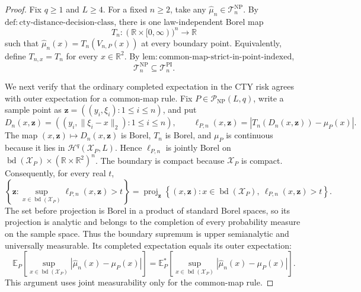 \documentclass{article}
\begin{document}
\begin{proof}
Fix \(q\geq1\) and \(L\geq4\).  For a fixed \(n\geq2\), take any \(\widehat\mu_n\in\mathcal T_n^{\mathrm{NP}}\).  By \(\mathrm{def:cty\text{-}distance\text{-}decision\text{-}class}\), there is one law-independent Borel map
\[
 T_n:(\mathbb R\times[0,\infty))^n\longrightarrow\mathbb R
\]
such that \(\widehat\mu_n(x)=T_n(V_{n,P}(x))\) at every boundary point.  Equivalently, define \(T_{n,x}=T_n\) for every \(x\in\mathbb R^2\).  By \(\mathrm{lem:common\text{-}map\text{-}strict\text{-}in\text{-}point\text{-}indexed}\),
\[
 \mathcal T_n^{\mathrm{NP}}\subseteq\mathcal T_n^{\mathrm{PI}}.
\]

We next verify that the ordinary completed expectation in the CTY risk agrees with outer expectation for a common-map rule.  Fix \(P\in\mathcal P_{\mathrm{NP}}(L,q)\), write a sample point as \(\mathbf z=((y_i,\xi_i):1\leq i\leq n)\), and put
\[
 D_n(x,\mathbf z)=((y_i,\lVert\xi_i-x\rVert_2):1\leq i\leq n),
 \qquad
 \ell_{P,n}(x,\mathbf z)
 =\left|T_n(D_n(x,\mathbf z))-\mu_P(x)\right|.
\]
The map \((x,\mathbf z)\mapsto D_n(x,\mathbf z)\) is Borel, \(T_n\) is Borel, and \(\mu_P\) is continuous because it lies in \(\mathcal H^q(\mathcal X_P,L)\).  Hence \(\ell_{P,n}\) is jointly Borel on \(\operatorname{bd}(\mathcal X_P)\times(\mathbb R\times\mathbb R^2)^n\).  The boundary is compact because \(\mathcal X_P\) is compact.  Consequently, for every real \(t\),
\[
 \left\{\mathbf z:
   \sup_{x\in\operatorname{bd}(\mathcal X_P)}
   \ell_{P,n}(x,\mathbf z)>t
 \right\}
 =\operatorname{proj}_{\mathbf z}
 \left\{(x,\mathbf z):
   x\in\operatorname{bd}(\mathcal X_P),\ 
   \ell_{P,n}(x,\mathbf z)>t
 \right\}.
\]
The set before projection is Borel in a product of standard Borel spaces, so its projection is analytic and belongs to the completion of every probability measure on the sample space.  Thus the boundary supremum is upper semianalytic and universally measurable.  Its completed expectation equals its outer expectation:
\[
 \mathbb E_P\!\left[
   \sup_{x\in\operatorname{bd}(\mathcal X_P)}
   |\widehat\mu_n(x)-\mu_P(x)|
 \right]
 =
 \mathbb E_P^*\!\left[
   \sup_{x\in\operatorname{bd}(\mathcal X_P)}
   |\widehat\mu_n(x)-\mu_P(x)|
 \right].
\]
This argument uses joint measurability only for the common-map rule.


\end{proof}
\end{document}
